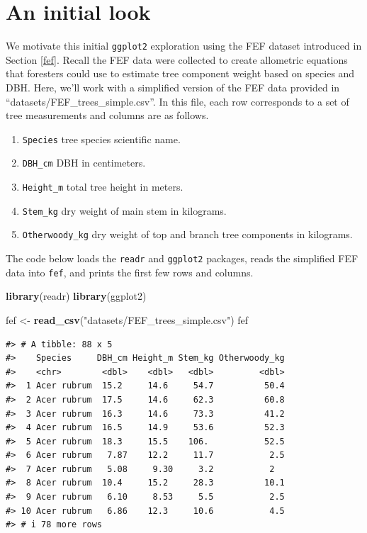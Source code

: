 \documentclass[
  11pt,
]{krantz}
\newenvironment{Shaded}{\begin{snugshade}}{\end{snugshade}}
\newcommand{\KeywordTok}[1]{\textcolor[rgb]{0.13,0.29,0.53}{\textbf{#1}}}
\newcommand{\NormalTok}[1]{#1}
\newcommand{\StringTok}[1]{\textcolor[rgb]{0.31,0.60,0.02}{#1}}
\providecommand{\tightlist}{%
  \setlength{\itemsep}{0pt}\setlength{\parskip}{0pt}}
\theoremstyle{definition}
\theoremstyle{definition}
\theoremstyle{definition}
\theoremstyle{definition}
\theoremstyle{remark}
\begin{document}
\hypertarget{ggplotInitialLook}{%
\section{An initial look}\label{ggplotInitialLook}}

We motivate this initial \texttt{ggplot2} exploration using the FEF dataset introduced in Section \ref{fef}. Recall the FEF data were collected to create allometric equations that foresters could use to estimate tree component weight based on species and DBH. Here, we'll work with a simplified version of the FEF data provided in ``datasets/FEF\_trees\_simple.csv''. In this file, each row corresponds to a set of tree measurements and columns are as follows.

\begin{enumerate}
\def\labelenumi{\arabic{enumi}.}
\tightlist
\item
  \texttt{Species} tree species scientific name.
\item
  \texttt{DBH\_cm} DBH in centimeters.
\item
  \texttt{Height\_m} total tree height in meters.
\item
  \texttt{Stem\_kg} dry weight of main stem in kilograms.
\item
  \texttt{Otherwoody\_kg} dry weight of top and branch tree components in kilograms.
\end{enumerate}

The code below loads the \texttt{readr} and \texttt{ggplot2} packages, reads the simplified FEF data into \texttt{fef}, and prints the first few rows and columns.

\begin{Shaded}
\begin{Highlighting}[]
\KeywordTok{library}\NormalTok{(readr)}
\KeywordTok{library}\NormalTok{(ggplot2)}

\NormalTok{fef \textless{}{-}}\StringTok{ }\KeywordTok{read\_csv}\NormalTok{(}\StringTok{"datasets/FEF\_trees\_simple.csv"}\NormalTok{)}
\NormalTok{fef}
\end{Highlighting}
\end{Shaded}

\begin{verbatim}
#> # A tibble: 88 x 5
#>    Species     DBH_cm Height_m Stem_kg Otherwoody_kg
#>    <chr>        <dbl>    <dbl>   <dbl>         <dbl>
#>  1 Acer rubrum  15.2     14.6     54.7          50.4
#>  2 Acer rubrum  17.5     14.6     62.3          60.8
#>  3 Acer rubrum  16.3     14.6     73.3          41.2
#>  4 Acer rubrum  16.5     14.9     53.6          52.3
#>  5 Acer rubrum  18.3     15.5    106.           52.5
#>  6 Acer rubrum   7.87    12.2     11.7           2.5
#>  7 Acer rubrum   5.08     9.30     3.2           2  
#>  8 Acer rubrum  10.4     15.2     28.3          10.1
#>  9 Acer rubrum   6.10     8.53     5.5           2.5
#> 10 Acer rubrum   6.86    12.3     10.6           4.5
#> # i 78 more rows
\end{verbatim}
\end{document}
